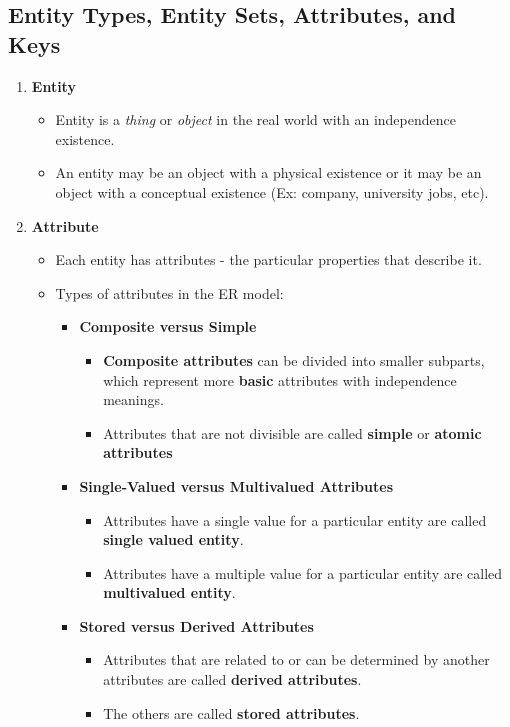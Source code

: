 \documentclass[10pt]{article}
\newcommand{\tf}{\textbf}
\newcommand{\ti}{\textit}
\begin{document}
\subsection{Entity Types, Entity Sets, Attributes, and Keys}
\begin{enumerate}
	\item \tf{Entity}
	\begin{itemize}
		\item Entity is a \ti{thing} or \ti{object} in the real world with an independence existence.
		\item An entity may be an object with a physical existence or it may be an object with a conceptual existence (Ex: company, university jobs, etc).
	\end{itemize}

	\item \tf{Attribute}
	\begin{itemize}
		\item Each entity has attributes - the particular properties that describe it.
		\item Types of attributes in the ER model:
		\begin{itemize}
			\item \tf{Composite versus Simple}
			\begin{itemize}
				\item \tf{Composite attributes} can be divided into smaller subparts, which represent more \tf{basic} attributes with independence meanings.
				\item Attributes that are not divisible are called \tf{simple} or \tf{atomic attributes} 
			\end{itemize}

			\item \tf{Single-Valued versus Multivalued Attributes}
			\begin{itemize}
				\item Attributes have a single value for a particular entity are called \tf{single valued entity}.
				\item Attributes have a multiple value for a particular entity are called \tf{multivalued entity}.
			\end{itemize}

			\item \tf{Stored versus Derived Attributes}
			\begin{itemize}
				\item Attributes that are related to or can be determined by another attributes are called \tf{derived attributes}.
				\item The others are called \tf{stored attributes}.
			\end{itemize}


\end{itemize}
\end{itemize}
\end{enumerate}
\end{document}
